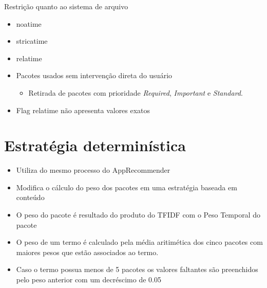 \begin{frame}
    Restrição quanto ao sistema de arquivo

    \begin{itemize}
        \item noatime
        \item stricatime
        \item relatime
    \end{itemize}
\end{frame}

\begin{frame}

    \begin{itemize}
        \item Pacotes usados sem intervenção direta do usuário
            \begin{itemize}
                \item Retirada de pacotes com prioridade \textit{Required},
                      \textit{Important} e \textit{Standard}.
            \end{itemize}
        \item Flag relatime não apresenta valores exatos
    \end{itemize}

\end{frame}

\section{Estratégia determinística} %
\label{sec:estrategia_deterministica}

\begin{frame}
\begin{itemize}
    \item Utiliza do mesmo processo do AppRecommender
    \item Modifica o cálculo do peso dos pacotes em uma estratégia
    baseada em conteúdo
    \item O peso do pacote é resultado do produto do TFIDF com o
    Peso Temporal do pacote
\end{itemize}
\end{frame}

\begin{frame}
\begin{itemize}
    \item O peso de um termo é calculado pela média aritimética dos cinco
pacotes com maiores pesos que estão associados
ao termo.
    \item Caso o termo possua menos de 5 pacotes os valores faltantes são
preenchidos pelo peso anterior com um decréscimo de 0.05
\end{itemize}
\end{frame}

